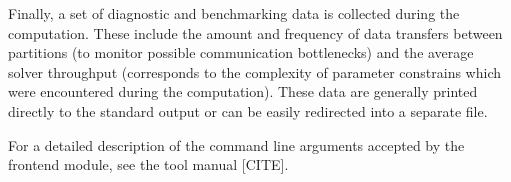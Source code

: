 Finally, a set of diagnostic and benchmarking data is collected during the computation. These include the amount and frequency of data transfers between partitions (to monitor possible communication bottlenecks) and the average solver throughput (corresponds to the complexity of parameter constrains which were encountered during the computation). These data are generally printed directly to the standard output or can be easily redirected into a separate file.

For a detailed description of the command line arguments accepted by the frontend module, see the tool manual [CITE].

